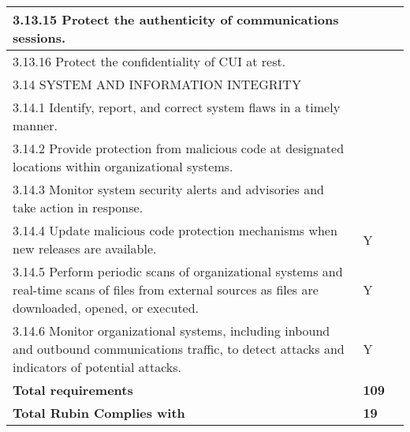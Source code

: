 \begin{longtable} {|p{}|p{}|p{} |}
{3.13.15 Protect the authenticity of communications sessions.}&& \\ \hline
{3.13.16 Protect the confidentiality of CUI at rest.}&& \\ \hline
{3.14 SYSTEM AND INFORMATION INTEGRITY}&& \\ \hline
{3.14.1 Identify, report, and correct system flaws in a timely manner.}&& \\ \hline
{3.14.2 Provide protection from malicious code at designated locations within organizational systems.}&& \\ \hline
{3.14.3 Monitor system security alerts and advisories and take action in response.}&& \\ \hline
{3.14.4 Update malicious code protection mechanisms when new releases are available.}&{Y}& \\ \hline
{3.14.5 Perform periodic scans of organizational systems and real-time scans of files from external sources as files are downloaded, opened, or executed.}&{Y}& \\ \hline
{3.14.6 Monitor organizational systems, including inbound and outbound communications traffic, to detect attacks and indicators of potential attacks.}&{Y}& \\ \hline
\textbf{Total requirements}&\textbf{109}& \\ \hline
\textbf{Total Rubin Complies with }&\textbf{19}& \\ \hline
\end{longtable} \normalsize
